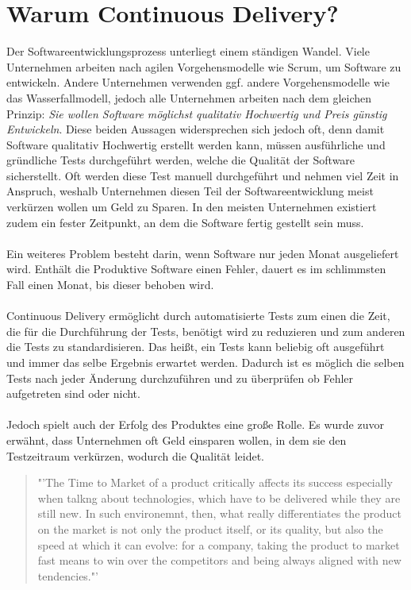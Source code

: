 \section{Warum Continuous Delivery?}
\label{sec:WarumContinuousDelivery}
Der Softwareentwicklungsprozess unterliegt einem ständigen Wandel. Viele Unternehmen arbeiten nach agilen Vorgehensmodelle wie Scrum, um Software zu entwickeln. Andere Unternehmen verwenden ggf. andere Vorgehensmodelle wie das Wasserfallmodell, jedoch alle Unternehmen arbeiten nach dem gleichen Prinzip: \textit{Sie wollen Software möglichst qualitativ Hochwertig und Preis günstig Entwickeln}. Diese beiden Aussagen widersprechen sich jedoch oft, denn damit Software qualitativ Hochwertig erstellt werden kann, müssen ausführliche und gründliche Tests durchgeführt werden, welche die Qualität der Software sicherstellt. Oft werden diese Test manuell durchgeführt und nehmen viel Zeit in Anspruch, weshalb Unternehmen diesen Teil der Softwareentwicklung meist verkürzen wollen um Geld zu Sparen. In den meisten Unternehmen existiert zudem ein fester Zeitpunkt, an dem die Software fertig gestellt sein muss.
\\\\
Ein weiteres Problem besteht darin, wenn Software nur jeden Monat ausgeliefert wird. Enthält die Produktive Software einen Fehler, dauert es im schlimmsten Fall einen Monat, bis dieser behoben wird.
\\\\
Continuous Delivery ermöglicht durch automatisierte Tests zum einen die Zeit, die für die Durchführung der Tests, benötigt wird zu reduzieren und zum anderen die Tests zu standardisieren. Das heißt, ein Tests kann beliebig oft ausgeführt und immer das selbe Ergebnis erwartet werden. Dadurch ist es möglich die selben Tests nach jeder Änderung durchzuführen und zu überprüfen ob Fehler aufgetreten sind oder nicht.
\\\\
Jedoch spielt auch der Erfolg des Produktes eine große Rolle. Es wurde zuvor erwähnt, dass Unternehmen oft Geld einsparen wollen, in dem sie den Testzeitraum verkürzen, wodurch die Qualität leidet.
\begin{quote}
	"'The Time to Market of a product critically affects its success especially when talkng about technologies, which have to be delivered while they are still new. In such environemnt, then, what really differentiates the product on the market is not only the product itself, or its quality, but also the speed at which it can evolve: for a company, taking the product to market fast means to win over the competitors and being always aligned with new tendencies."'\cite{IEEE:CDMitJenkins}
\end{quote}
